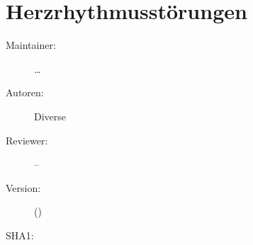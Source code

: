 \def\ChapterCode{FORTBILDUNG}
	\chapter
[\CO{[FORTBILDUNG]} Herzrhythmusstörungen]
{Herzrhythmusstörungen}
\label{chp:ADVANCED-Atemweg}

\ChapterIntro
{%

}
{%
\begin{description}
  \item[Maintainer:] \ldots
  \item[Autoren:] Diverse
  \item[Reviewer:] --
  \item[Version:] {\DocVersion} ({\DocVersionInfo})
  \item[SHA1:] {\DocGitCommit}
\end{description}

{\TxTeilkapitelAASS}}



\clearpage %


\ChapterEnd